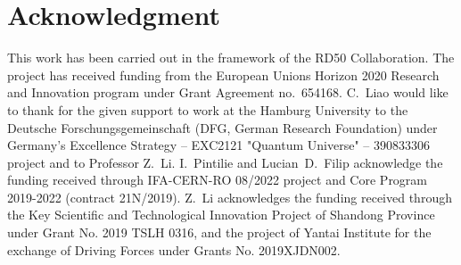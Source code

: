 \documentclass[final, 5p, times]{elsarticle}
\begin{document}
\section*{Acknowledgment}
This work has been carried out in the framework of the RD50 Collaboration.
The project has received funding from the European Unions Horizon 2020 Research and Innovation program under Grant Agreement no.\ 654168. C.~Liao would like to thank for the given support to work at the Hamburg University to the Deutsche Forschungsgemeinschaft (DFG, German Research Foundation) under Germany's Excellence Strategy -- EXC2121 "Quantum Universe" -- 390833306 project and to Professor Z.~Li. I.~Pintilie and Lucian~D.~Filip acknowledge the funding received through IFA-CERN-RO 08/2022 project and Core Program 2019-2022 (contract 21N/2019). Z.~Li acknowledges the funding received through the Key Scientific and Technological Innovation Project of Shandong Province under Grant No. 2019 TSLH 0316, and the project of Yantai Institute for the exchange of Driving Forces under Grants No. 2019XJDN002.








\end{document}
